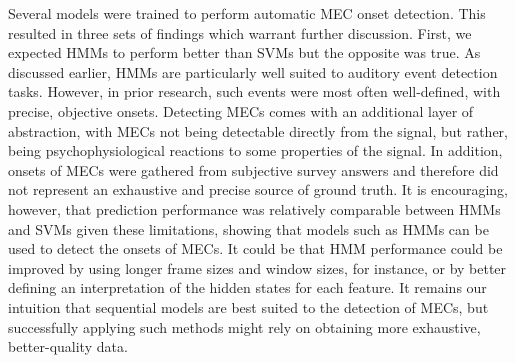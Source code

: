 Several models were trained to perform automatic MEC onset detection. This resulted in three sets of findings which warrant further discussion. First, we expected HMMs to perform better than SVMs but the opposite was true. As discussed earlier, HMMs are particularly well suited to auditory event detection tasks. However, in prior research, such events were most often well-defined, with precise, objective onsets. Detecting MECs comes with an additional layer of abstraction, with MECs not being detectable directly from the signal, but rather, being psychophysiological reactions to some properties of the signal. In addition, onsets of MECs were gathered from subjective survey answers and therefore did not represent an exhaustive and precise source of ground truth. It is encouraging, however, that prediction performance was relatively comparable between HMMs and SVMs given these limitations, showing that models such as HMMs can be used to detect the onsets of MECs. It could be that HMM performance could be improved by using longer frame sizes and window sizes, for instance, or by better defining an interpretation of the hidden states for each feature. It remains our intuition that sequential models are best suited to the detection of MECs, but successfully applying such methods might rely on obtaining more exhaustive, better-quality data.

